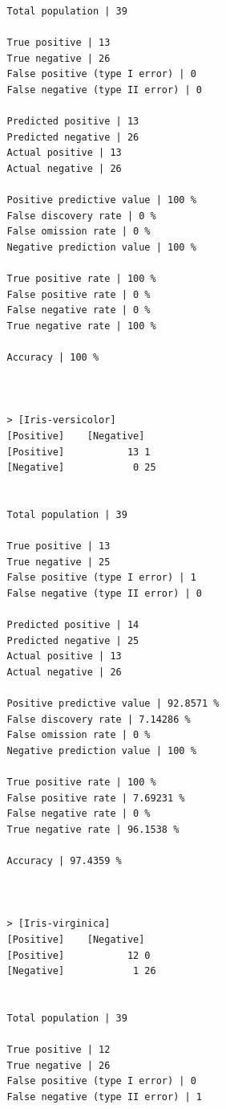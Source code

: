 \documentclass{classrep}
\begin{document}
{{{\begin{lstlisting}
                Total population | 39

                True positive | 13
                True negative | 26
                False positive (type I error) | 0
                False negative (type II error) | 0

                Predicted positive | 13
                Predicted negative | 26
                Actual positive | 13
                Actual negative | 26

                Positive predictive value | 100 %
                False discovery rate | 0 %
                False omission rate | 0 %
                Negative prediction value | 100 %

                True positive rate | 100 %
                False positive rate | 0 %
                False negative rate | 0 %
                True negative rate | 100 %

                Accuracy | 100 %



                > [Iris-versicolor]
                [Positive]    [Negative]
                [Positive]           13 1
                [Negative]            0 25


                Total population | 39

                True positive | 13
                True negative | 25
                False positive (type I error) | 1
                False negative (type II error) | 0

                Predicted positive | 14
                Predicted negative | 25
                Actual positive | 13
                Actual negative | 26

                Positive predictive value | 92.8571 %
                False discovery rate | 7.14286 %
                False omission rate | 0 %
                Negative prediction value | 100 %

                True positive rate | 100 %
                False positive rate | 7.69231 %
                False negative rate | 0 %
                True negative rate | 96.1538 %

                Accuracy | 97.4359 %



                > [Iris-virginica]
                [Positive]    [Negative]
                [Positive]           12 0
                [Negative]            1 26


                Total population | 39

                True positive | 12
                True negative | 26
                False positive (type I error) | 0
                False negative (type II error) | 1


\end{lstlisting}}}}
\end{document}
